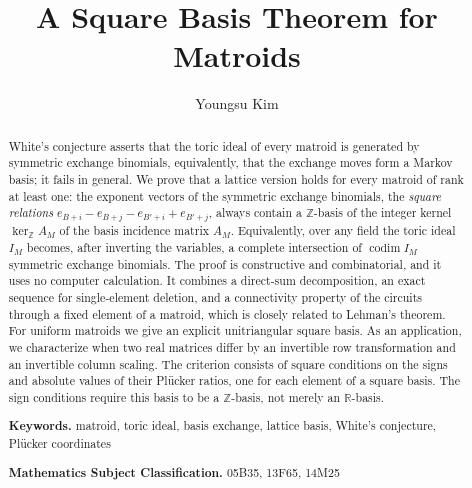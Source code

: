 \documentclass[11pt,a4paper]{article}
\title{A Square Basis Theorem for Matroids}
\author{Youngsu Kim}
\date{}
\theoremstyle{plain}
\theoremstyle{definition}
\newcommand{\R}{\mathbb R}
\newcommand{\Z}{\mathbb Z}
\newcommand{\AM}{A_M}
\newcommand{\kerZ}{\ker_{\Z}\!A_M}
\begin{document}
\maketitle

\begin{abstract}
\noindent White's conjecture asserts that the toric ideal of every matroid is generated by symmetric exchange binomials, equivalently, that the exchange moves form a Markov basis; it fails in general. We prove that a lattice version holds for every matroid of rank at least one: the exponent vectors of the symmetric exchange binomials, the \emph{square relations} $e_{B+i}-e_{B+j}-e_{B'+i}+e_{B'+j}$, always contain a $\Z$-basis of the integer kernel $\kerZ$ of the basis incidence matrix $\AM$. Equivalently, over any field the toric ideal $I_M$ becomes, after inverting the variables, a complete intersection of $\operatorname{codim} I_M$ symmetric exchange binomials. The proof is constructive and combinatorial, and it uses no computer calculation. It combines a direct-sum decomposition, an exact sequence for single-element deletion, and a connectivity property of the circuits through a fixed element of a matroid, which is closely related to Lehman's theorem. For uniform matroids we give an explicit unitriangular square basis. As an application, we characterize when two real matrices differ by an invertible row transformation and an invertible column scaling. The criterion consists of square conditions on the signs and absolute values of their Pl\"ucker ratios, one for each element of a square basis. The sign conditions require this basis to be a $\Z$-basis, not merely an $\R$-basis.

\vspace{1.2em}\noindent\textbf{Keywords.} matroid, toric ideal, basis exchange, lattice basis, White's conjecture, Pl\"ucker coordinates

\smallskip\noindent\textbf{Mathematics Subject Classification.} 05B35, 13F65, 14M25
\end{abstract}

\end{document}
